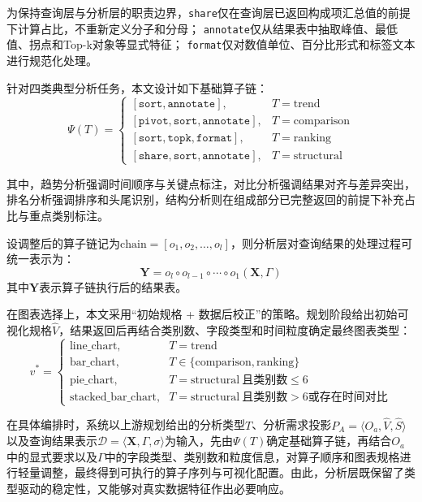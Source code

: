为保持查询层与分析层的职责边界，\texttt{share}仅在查询层已返回构成项汇总值的前提下计算占比，不重新定义分子和分母；
\texttt{annotate}仅从结果表中抽取峰值、最低值、拐点和Top-k对象等显式特征；
\texttt{format}仅对数值单位、百分比形式和标签文本进行规范化处理。

针对四类典型分析任务，本文设计如下基础算子链：
\begin{equation}
\Psi(T)=
\begin{cases}
[\texttt{sort}, \texttt{annotate}], & T=\text{trend} \\
[\texttt{pivot}, \texttt{sort}, \texttt{annotate}], & T=\text{comparison} \\
[\texttt{sort}, \texttt{topk}, \texttt{format}], & T=\text{ranking} \\
[\texttt{share}, \texttt{sort}, \texttt{annotate}], & T=\text{structural}
\end{cases}
\label{eq:operator_chain}
\end{equation}

其中，趋势分析强调时间顺序与关键点标注，对比分析强调结果对齐与差异突出，排名分析强调排序和头尾识别，结构分析则在组成部分已完整返回的前提下补充占比与重点类别标注。

设调整后的算子链记为$\text{chain}=[o_1,o_2,\ldots,o_l]$，则分析层对查询结果的处理过程可统一表示为：
\begin{equation}
\mathbf{Y}=o_l \circ o_{l-1} \circ \cdots \circ o_1 (\mathbf{X}, \Gamma)
\label{eq:operator_compose}
\end{equation}
其中$\mathbf{Y}$表示算子链执行后的结果表。


在图表选择上，本文采用“初始规格 + 数据后校正”的策略。规划阶段给出初始可视化规格$\hat{V}$，结果返回后再结合类别数、字段类型和时间粒度确定最终图表类型：
\begin{equation}
v^* =
\begin{cases}
\text{line\_chart}, & T=\text{trend} \\
\text{bar\_chart}, & T\in\{\text{comparison}, \text{ranking}\} \\
\text{pie\_chart}, & T=\text{structural}\ \text{且类别数}\leq 6 \\
\text{stacked\_bar\_chart}, & T=\text{structural}\ \text{且类别数}> 6 \text{或存在时间对比}
\end{cases}
\label{eq:vis_rule}
\end{equation}

在具体编排时，系统以上游规划给出的分析类型$T$、分析需求投影$P_A=\langle O_a, \hat{V}, \hat{S} \rangle$以及查询结果表示$\mathcal{D}=\langle \mathbf{X}, \Gamma, \sigma \rangle$为输入，先由$\Psi(T)$确定基础算子链，再结合$O_a$中的显式要求以及$\Gamma$中的字段类型、类别数和粒度信息，对算子顺序和图表规格进行轻量调整，最终得到可执行的算子序列与可视化配置。由此，分析层既保留了类型驱动的稳定性，又能够对真实数据特征作出必要响应。

